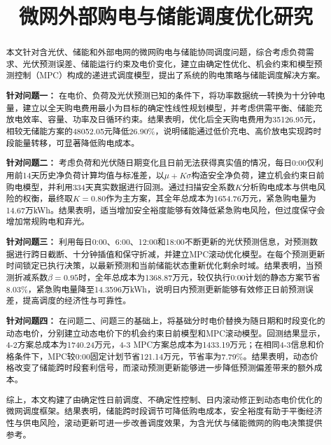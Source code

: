 \documentclass{cumcmthesis}
\title{微网外部购电与储能调度优化研究}
\begin{document}
\maketitle

\begin{abstract}

本文针对含光伏、储能和外部电网的微网购电与储能协同调度问题，综合考虑负荷需求、光伏预测误差、储能运行约束及电价变化，建立由确定性优化、机会约束和模型预测控制（MPC）构成的递进式调度模型，提出了系统的购电策略与储能调度解决方案。

\textbf{针对问题一：}
在电价、负荷及光伏预测已知的条件下，将功率数据统一转换为十分钟电量，建立以全天购电费用最小为目标的确定性线性规划模型，并考虑供需平衡、储能充放电效率、容量、功率及日循环约束。结果表明，优化后全天购电费用为35126.95元，相较无储能方案的48052.05元降低26.90\%，说明储能通过低价充电、高价放电实现跨时段能量转移，可显著降低购电成本。

\textbf{针对问题二：}
考虑负荷和光伏随日期变化且日前无法获得真实值的情况，每日0:00仅利用前14天历史净负荷计算均值与标准差，以$\mu+K\sigma$构造安全净负荷，建立机会约束日前购电模型，并利用334天真实数据进行回测。通过扫描安全系数$K$分析购电成本与供电风险的权衡，最终取$K=0.80$作为主方案，其全年总成本为1654.76万元，紧急购电量为14.67万kWh。结果表明，适当增加安全裕度能够有效降低紧急购电风险，但过度保守会增加常规购电和弃光。

\textbf{针对问题三：}
利用每日0:00、6:00、12:00和18:00不断更新的光伏预测信息，对预测数据进行跨日截断、十分钟插值和保守折减，并建立MPC滚动优化模型。在每个预测更新时间锁定已执行决策，以最新预测和当前储能状态重新优化剩余时域。结果表明，当预测折减系数$\beta=0.95$时，全年总成本为1368.87万元，较仅执行0:00计划的静态方案节省8.03\%，紧急购电量降至14.3596万kWh，说明日内预测更新能够有效修正日前预测误差，提高调度的经济性与可靠性。

\textbf{针对问题四：}
在问题二、问题三的基础上，将基础分时电价替换为随日期和时段变化的动态电价，分别建立动态电价下的机会约束日前模型和MPC滚动模型。回测结果显示，4-2方案总成本为1740.24万元，4-3 MPC方案总成本为1433.19万元；在相同4-3信息和价格条件下，MPC较0:00固定计划节省121.14万元，节省率为7.79\%。结果表明，动态价格改变了储能跨时段套利信号，而滚动预测更新能够进一步降低预测偏差带来的额外成本。

综上，本文构建了由确定性日前调度、不确定性控制、日内滚动修正到动态电价优化的微网调度框架。结果表明，储能跨时段调节可降低购电成本，安全裕度有助于平衡经济性与供电风险，滚动更新可进一步改善调度效果，为含光伏与储能微网的购电决策提供参考。


\end{abstract}
\end{document}
